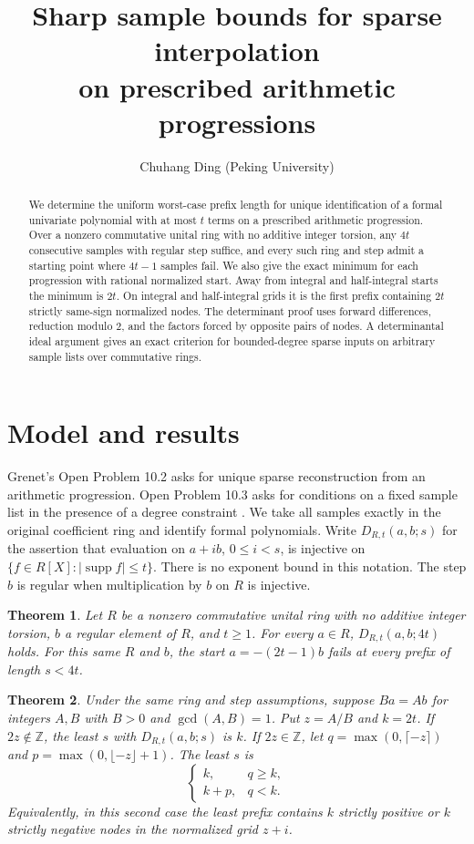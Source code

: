\documentclass[10pt]{article}
\title{Sharp sample bounds for sparse interpolation\\on prescribed arithmetic progressions}
\author{Chuhang Ding (Peking University)}
\date{}
\newtheorem{theorem}{Theorem}[section]
\newcommand{\Z}{\mathbb Z}
\newcommand{\supp}{\operatorname{supp}}
\begin{document}
\maketitle
\begin{abstract}
We determine the uniform worst-case prefix length for unique identification
of a formal univariate polynomial with at most $t$ terms on a prescribed
arithmetic progression. Over a nonzero commutative unital ring with no
additive integer torsion, any $4t$ consecutive samples with regular step
suffice, and every such ring and step admit a starting point where $4t-1$
samples fail. We also give the exact minimum for each progression with
rational normalized start. Away from integral and half-integral starts
the minimum is $2t$. On integral and half-integral grids it is the first
prefix containing $2t$ strictly same-sign normalized nodes.
The determinant proof uses forward differences, reduction modulo $2$,
and the factors forced by opposite pairs of nodes. A determinantal ideal
argument gives an exact criterion for bounded-degree sparse inputs on
arbitrary sample lists over commutative rings.
\end{abstract}

\section{Model and results}
Grenet's Open Problem 10.2 asks for unique sparse reconstruction from an
arithmetic progression. Open Problem 10.3 asks for conditions on a fixed
sample list in the presence of a degree constraint \cite{grenet}. We take
all samples exactly in the original coefficient ring and identify formal
polynomials. Write $D_{R,t}(a,b;s)$ for the assertion that evaluation on
$a+ib$, $0\le i<s$, is injective on $\{f\in R[X]: |\supp f|\le t\}$.
There is no exponent bound in this notation. The step $b$ is regular when
multiplication by $b$ on $R$ is injective.

\begin{theorem}\label{thm:main}
Let $R$ be a nonzero commutative unital ring with no additive integer
torsion, $b$ a regular element of $R$, and $t\ge1$. For every $a\in R$,
$D_{R,t}(a,b;4t)$ holds. For this same $R$ and $b$, the start
$a=-(2t-1)b$ fails at every prefix of length $s<4t$.
\end{theorem}

\begin{theorem}\label{thm:rat}
Under the same ring and step assumptions, suppose $Ba=Ab$ for integers
$A,B$ with $B>0$ and $\gcd(A,B)=1$. Put $z=A/B$ and $k=2t$.
If $2z\notin\Z$, the least $s$ with $D_{R,t}(a,b;s)$ is $k$.
If $2z\in\Z$, let $q=\max(0,\lceil-z\rceil)$ and
$p=\max(0,\lfloor-z\rfloor+1)$. The least $s$ is
\[
  \begin{cases}
  k,&q\ge k,\\
  k+p,&q<k .
  \end{cases}
\]
Equivalently, in this second case the least prefix contains $k$ strictly
positive or $k$ strictly negative nodes in the normalized grid $z+i$.
\end{theorem}
\end{document}
